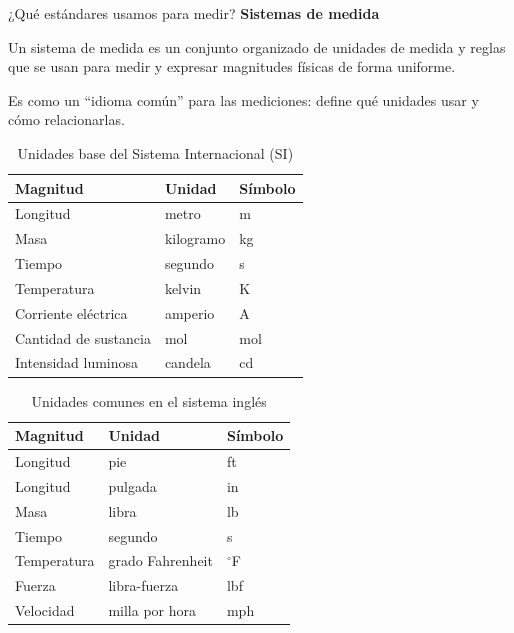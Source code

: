 \begin{frame}{¿Qué estándares usamos para medir?}
    \textbf{Sistemas de medida}

Un sistema de medida es un conjunto organizado de unidades de medida y reglas que se usan para medir y expresar magnitudes físicas de forma uniforme.

Es como un “idioma común” para las mediciones: define qué unidades usar y cómo relacionarlas.

    \begin{table}[h]
\centering
\caption{Unidades base del Sistema Internacional (SI)}
\begin{tabular}{|l|l|l|}
\hline
\textbf{Magnitud} & \textbf{Unidad} & \textbf{Símbolo} \\ \hline
Longitud & metro & m \\ \hline
Masa & kilogramo & kg \\ \hline
Tiempo & segundo & s \\ \hline
Temperatura & kelvin & K \\ \hline
Corriente eléctrica & amperio & A \\ \hline
Cantidad de sustancia & mol & mol \\ \hline
Intensidad luminosa & candela & cd \\ \hline
\end{tabular}
\end{table}
\end{frame}

\begin{frame}
    \begin{table}[h]
\centering
\caption{Unidades comunes en el sistema inglés}
\begin{tabular}{|l|l|l|}
\hline
\textbf{Magnitud} & \textbf{Unidad} & \textbf{Símbolo} \\ \hline
Longitud & pie & ft \\ \hline
Longitud & pulgada & in \\ \hline
Masa & libra & lb \\ \hline
Tiempo & segundo & s \\ \hline
Temperatura & grado Fahrenheit & $^\circ$F \\ \hline
Fuerza & libra-fuerza & lbf \\ \hline
Velocidad & milla por hora & mph \\ \hline
\end{tabular}
\end{table}

\end{frame}

